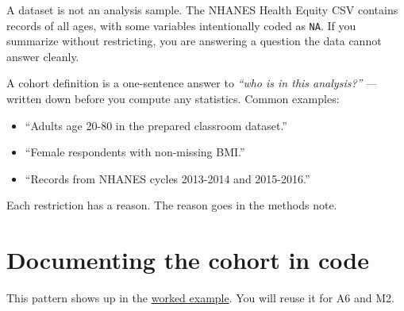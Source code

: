 \documentclass[
  letterpaper,
  DIV=11,
  numbers=noendperiod,
  oneside]{scrreprt}
\providecommand{\tightlist}{%
  \setlength{\itemsep}{0pt}\setlength{\parskip}{0pt}}
\begin{document}

A dataset is not an analysis sample. The NHANES Health Equity CSV
contains records of all ages, with some variables intentionally coded as
\texttt{NA}. If you summarize without restricting, you are answering a
question the data cannot answer cleanly.

A cohort definition is a one-sentence answer to \emph{``who is in this
analysis?''} --- written down before you compute any statistics. Common
examples:

\begin{itemize}
\tightlist
\item
  ``Adults age 20-80 in the prepared classroom dataset.''
\item
  ``Female respondents with non-missing BMI.''
\item
  ``Records from NHANES cycles 2013-2014 and 2015-2016.''
\end{itemize}

Each restriction has a reason. The reason goes in the methods note.

\section*{Documenting the cohort in
code}\label{documenting-the-cohort-in-code}


This pattern shows up in the \href{eda03-worked-example.qmd}{worked
example}. You will reuse it for A6 and M2.
\end{document}
